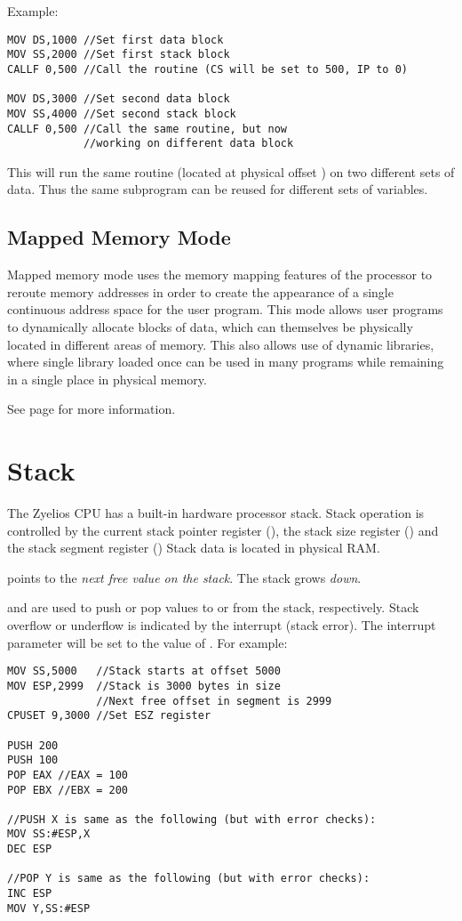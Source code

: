 Example:
\begin{verbatim}
MOV DS,1000 //Set first data block
MOV SS,2000 //Set first stack block
CALLF 0,500 //Call the routine (CS will be set to 500, IP to 0)

MOV DS,3000 //Set second data block
MOV SS,4000 //Set second stack block
CALLF 0,500 //Call the same routine, but now
            //working on different data block
\end{verbatim}

This will run the same routine (located at physical offset ) on two different sets of data. Thus the same subprogram can be reused for different sets of variables.

\subsection{Mapped Memory Mode}
Mapped memory mode uses the memory mapping features of the processor to reroute memory addresses in order to create the appearance of a single continuous address space for the user program. This mode allows user programs to dynamically allocate blocks of data, which can themselves be physically located in different areas of memory. This also allows use of dynamic libraries, where single library loaded once can be used in many programs while remaining in a single place in physical memory.

See page \pageref{paging} for more information.

\section{Stack} \label{stack}
The Zyelios CPU has a built-in hardware processor stack. Stack operation is controlled by the current stack pointer register (), the stack size register () and the stack segment register () Stack data is located in physical RAM.

 points to the \emph{next free value on the stack}. The stack grows \emph{down}.

 and  are used to push or pop values to or from the stack, respectively. Stack overflow or underflow is indicated by the interrupt  (stack error). The interrupt parameter will be set to the value of . For example:

\begin{verbatim}
MOV SS,5000   //Stack starts at offset 5000
MOV ESP,2999  //Stack is 3000 bytes in size
              //Next free offset in segment is 2999
CPUSET 9,3000 //Set ESZ register

PUSH 200
PUSH 100
POP EAX //EAX = 100
POP EBX //EBX = 200

//PUSH X is same as the following (but with error checks):
MOV SS:#ESP,X
DEC ESP

//POP Y is same as the following (but with error checks):
INC ESP
MOV Y,SS:#ESP
\end{verbatim}

